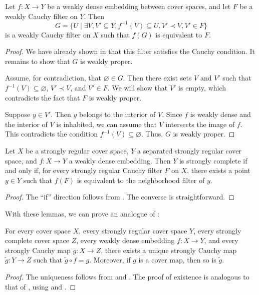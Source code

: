 \documentclass[reqno]{amsart}
\theoremstyle{definition}
\theoremstyle{remark}
\numberwithin{figure}{section}
\newcommand{\rb}{\prec}
\begin{document}
\begin{lem}
Let $f : X \to Y$ be a weakly dense embedding between cover spaces, and let $F$ be a weakly Cauchy filter on $Y$.
Then
\[ G = \{ U \mid \exists V,V' \subseteq Y, f^{-1}(V) \subseteq U, V' \rb V, V' \in F \} \]
is a weakly Cauchy filter on $X$ such that $f(G)$ is equivalent to $F$.
\end{lem}
\begin{proof}
We have already shown in  that this filter satisfies the Cauchy condition.
It remains to show that $G$ is weakly proper.

Assume, for contradiction, that $\varnothing \in G$.
Then there exist sets $V$ and $V'$ such that $f^{-1}(V) \subseteq \varnothing$, $V' \rb V$, and $V' \in F$.
We will show that $V'$ is empty, which contradicts the fact that $F$ is weakly proper.

Suppose $y \in V'$.
Then $y$ belongs to the interior of $V$.
Since $f$ is weakly dense and the interior of $V$ is inhabited, we can assume that $V$ intersects the image of $f$.
This contradicts the condition $f^{-1}(V) \subseteq \varnothing$.
Thus, $G$ is weakly proper.
\end{proof}

\begin{lem}
Let $X$ be a strongly regular cover space, $Y$ a separated strongly regular cover space, and $f : X \to Y$ a weakly dense embedding.
Then $Y$ is strongly complete if and only if, for every strongly regular Cauchy filter $F$ on $X$, there exists a point $y \in Y$ such that $f(F)$ is equivalent to the neighborhood filter of $y$.
\end{lem}
\begin{proof}
The ``if'' direction follows from .
The converse is straightforward.
\end{proof}

With these lemmas, we can prove an analogue of :

\begin{thm}
For every cover space $X$, every strongly regular cover space $Y$, every strongly complete cover space $Z$, every weakly dense embedding $f : X \to Y$, and every strongly Cauchy map $g : X \to Z$,
there exists a unique strongly Cauchy map $\widetilde{g} : Y \to Z$ such that $\widetilde{g} \circ f = g$.
Moreover, if $g$ is a cover map, then so is $\widetilde{g}$.
\end{thm}
\begin{proof}
The uniqueness follows from  and .
The proof of existence is analogous to that of , using  and .
\end{proof}
\end{document}

